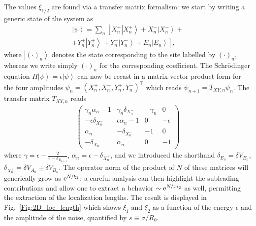 \documentclass[prl,aps,twocolumn,showpacs,superscriptaddress,longbibliography]{revtex4-1}
\newcommand{\be}{\begin{equation}}
\newcommand{\ee}{\end{equation}}
\newcommand{\rme}[1]{{\rm{e}}^{#1}}
\newcommand{\lqq}{\left[}
\newcommand{\rqq}{\right]}
\newcommand{\ran}{\right\rangle}
\newcommand{\ket}[1]{\left| #1 \ran}
\begin{document}
The values $\xi_{1/2}$ are found via a transfer matrix formalism: we start by writing a generic state of the system as 
\be
\begin{split}
	\ket{\psi} = \sum_n \lqq  X_n^+ \ket{X_n^+} + X_n^- \ket{X_n^-} + \right. \\
	\left. + Y_n^+ \ket{Y_n^+} + Y_n^- \ket{Y_n^-} + E_n \ket{E_n}    \rqq,
\end{split}
\ee
where $\ket{(\cdot)_n}$ denotes the state corresponding to the site labelled by $(\cdot)_n$, whereas we write simply $(\cdot)_n$ for the corresponding coefficient. The Schr\"odinger equation $H \ket{\psi} = \epsilon \ket{\psi}$ can now be recast in a matrix-vector product form for the four amplitudes $\psi_n = (X_n^+, X_n^-, Y_n^+, Y_n^-)^\intercal$ \cite{SM} which reads $\psi_{n+1} = T_{XY,n} \psi_n$. The transfer matrix $T_{XY,n}$ reads
%
  \begin{align}
    \begin{pmatrix} 
	\gamma_n \alpha_n  -1        &   \gamma_n \delta_{X^-_n}                & -\gamma_n         & 0 \\
	  -\epsilon \delta_{X^-_n}          & \epsilon \alpha_n  -1              & 0      & -\epsilon \\
	  \alpha_n                                & -\delta_{X^-_n}                                          & -1              & 0\\
	    -\delta_{X^-_n}                                 &  \alpha_n                                        &  0              & -1        
  \end{pmatrix}
  \label{Eq:Transfer_Matrix}
  \end{align}
 where $\gamma = \epsilon - \tfrac{2}{\epsilon-\delta_{E_{n+1}}}$, $\alpha_n = \epsilon - \delta_{X^+_n}$, and we introduced the shorthand $\delta_{E_n} = \delta V_{E_n}$, $\delta_{X_n^\pm} = \delta V_{A_n} \pm \delta V_{B_n}$. The operator norm of the product of $N$ of these matrices will generically grow as $\rme{N / \xi_1}$; a careful analysis can then highlight the subleading contributions \cite{a_Dwivedi_PRB_93} and allow one to extract a behavior $\sim \rme{N / xi_2}$ as well, permitting the extraction of the localization lengths. The result is displayed in Fig.~\ref{Fig:2D_loc_length} which shows $\xi_1$ and $\xi_2$ as a function of the energy $\epsilon$ and the amplitude of the noise, quantified by $s \equiv \sigma / R_0$. 
\end{document}

